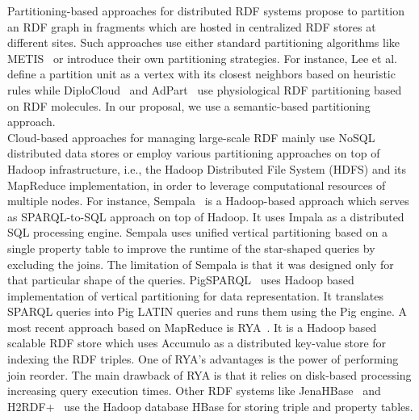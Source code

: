 Partitioning-based approaches for distributed RDF systems propose to partition an RDF graph in fragments which are hosted in centralized RDF stores at different sites. 
Such approaches use either standard partitioning algorithms like METIS~\cite{GurajadaSMT14} or introduce their own partitioning strategies. 
For instance, Lee et al.~\cite{LeeL2013} define a partition unit as a vertex with its closest neighbors based on heuristic rules while DiploCloud~\cite{WylotC16} and AdPart~\cite{harbi2016accelerating} use physiological RDF partitioning based on RDF molecules. 
In our proposal, we use a semantic-based partitioning approach.
~\\
Cloud-based approaches for managing large-scale RDF mainly use NoSQL distributed data stores or employ various partitioning approaches on top of Hadoop infrastructure, i.e., the Hadoop Distributed File System (HDFS) and its MapReduce implementation, in order to leverage computational resources of multiple nodes. 
For instance, Sempala~\cite{Schatzle2014Sempala} is a Hadoop-based approach which serves as SPARQL-to-SQL approach on top of Hadoop.
It uses Impala as a distributed SQL processing engine. 
Sempala uses unified vertical partitioning based on a single property table to improve the runtime of the star-shaped queries by excluding the joins. 
The limitation of Sempala is that it was designed only for that particular shape of the queries.
PigSPARQL~\cite{Schatzle2011PMS} uses Hadoop based implementation of vertical partitioning for data representation. 
It translates SPARQL queries into Pig LATIN queries and runs them using the Pig engine.
A most recent approach based on MapReduce is RYA~\cite{Punnoose2012Rya}.
It is a Hadoop based scalable RDF store which uses Accumulo as a distributed key-value store for indexing the RDF triples.
One of RYA's advantages is the power of performing join reorder. 
The main drawback of RYA is that it relies on disk-based processing increasing query execution times.
Other RDF systems like JenaHBase~\cite{KhadilkarKTC2012} and H2RDF+~\cite{PapailiouKTKK13} use the Hadoop database HBase for storing triple and property tables.

